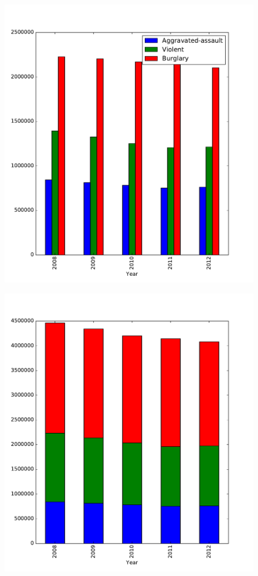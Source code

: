 \begin{figure}[H] %
    \centering
    \begin{minipage}[b]{.48\textwidth}
    	 \includegraphics[width=\textwidth]{bar1.pdf}
	 \label{fig:overlap_hist}
    \end{minipage}
    \quad
    \begin{minipage}[b]{.48\textwidth}
    	\includegraphics[width=\textwidth]{bar2.pdf}
	\label{fig:stacked_hist}
    \end{minipage}
\end{figure}

